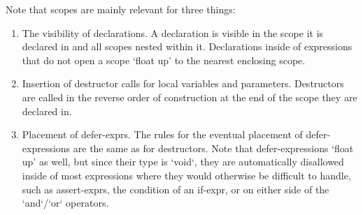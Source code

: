 \documentclass[a4paper, 12pt, oneside, final]{article}
\begin{document}
\noindent Note that scopes are mainly relevant for three things:
\begin{enumerate}
\item The visibility of declarations. A declaration is visible in the scope it is declared in and all scopes nested within it.
      Declarations inside of expressions that do not open a scope ‘float up’ to the nearest enclosing scope.
\item Insertion of destructor calls for local variables and parameters. Destructors are called in the reverse order of
      construction at the end of the scope they are declared in.
\item Placement of defer-exprs. The rules for the eventual placement of defer-expressions are the same as for destructors. Note
      that defer-expressions ‘float up’ as well, but since their type is `void`, they are automatically disallowed inside of
      most expressions where they would otherwise be difficult to handle, such as assert-exprs, the condition of an if-expr,
      or on either side of the `and`/`or` operators.
\end{enumerate}
\end{document}
